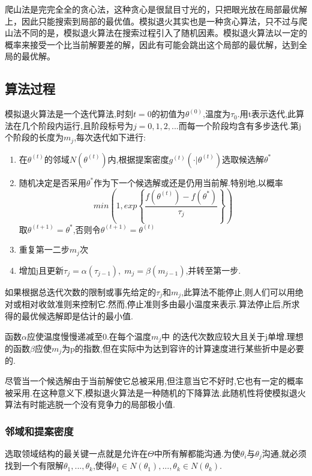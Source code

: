 \documentclass[11pt,a4paper,oneside]{book}
\begin{document}
爬山法是完完全全的贪心法，这种贪心是很鼠目寸光的，只把眼光放在局部最优解上，因此只能搜索到局部的最优值。模拟退火其实也是一种贪心算法，只不过与爬山法不同的是，模拟退火算法在搜索过程引入了随机因素。模拟退火算法以一定的概率来接受一个比当前解要差的解，因此有可能会跳出这个局部的最优解，达到全局的最优解。

\subsection{算法过程}
模拟退火算法是一个迭代算法,时刻$ t=0 $的初值为$ \theta^{(0)} $,温度为$ \tau_0 $.用t表示迭代,此算法在几个阶段内运行,且阶段标号为$ j=0,1,2,... $而每一个阶段均含有多步迭代.第j个阶段的长度为$ m_j $,每次迭代如下进行:
\begin{enumerate}
	\item 在$ \theta^{(t)} $的邻域$ N(\theta^{(t)}) $内,根据提案密度$ g^{(t)}(\cdot|\theta^{(t)}) $选取候选解$ \theta^{*}  $
	\item 随机决定是否采用$ \theta^* $作为下一个候选解或还是仍用当前解.特别地,以概率
	$$min(1,exp\left\lbrace \frac{f(\theta^{(t)} )-f(\theta^{*} )}{\tau_j}\right\rbrace )$$
	取$ \theta^{(t+1)}=\theta^*$,否则令$ \theta^{(t+1)} =\theta^{(t)}  $
	\item 重复第一二步$ m_j $次
	\item 增加j且更新$ \tau_j=\alpha(\tau_{j-1}),\;m_j=\beta(m_{j-1}) $,并转至第一步.
\end{enumerate}

如果根据总迭代次数的限制或事先给定的$ \tau_j $和$ m_j $,此算法不能停止,则人们可以用绝对或相对收敛准则来控制它.然而,停止准则多由最小温度来表示.算法停止后,所求得的最优候选解即是估计的最小值.

函数$ \alpha $应使温度慢慢递减至0.在每个温度$ m_j $中 的迭代次数应较大且关于j单增.理想的函数$ \beta $应使$ m_j $为p的指数,但在实际中为达到容许的计算速度进行某些折中是必要的.

尽管当一个候选解由于当前解使它总被采用,但注意当它不好时,它也有一定的概率被采用.在这种意义下,模拟退火算法是一种随机的下降算法.此随机性将使模拟退火算法有时能逃脱一个没有竞争力的局部极小值.

\subsubsection{邻域和提案密度}

选取领域结构的最关键一点就是允许在$ \Theta $中所有解都能沟通.为使$ \theta_i $与$ \theta_j $沟通,就必须找到一个有限解$ \theta_1,...,\theta_k $,使得$ \theta_1\in N(\theta_1),...,\theta_k\in N(\theta_k) $.
\end{document}
